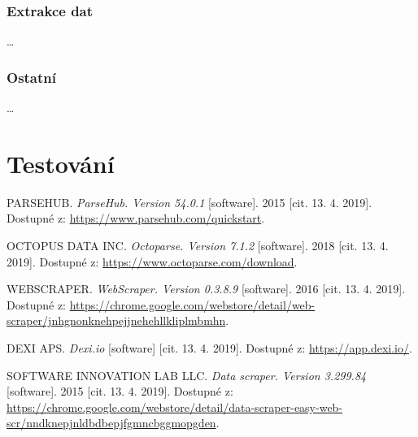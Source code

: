 \documentclass[thesis=B,czech]{FITthesis2}[2012/06/26]
\begin{document}
	\subsection{Extrakce dat}
	\dots
	
	\subsection{Ostatní}
	\dots
	
	
	\chapter{Testování}
	
	
	\begin{conclusion}
	\end{conclusion}
	
	
	
	\begin{thebibliography}{9}
		PARSEHUB. \textit{ParseHub. Version 54.0.1} [software]. 2015 [cit. 13. 4. 2019]. Dostupné z: \url{https://www.parsehub.com/quickstart}.
		
		OCTOPUS DATA INC. \textit{Octoparse. Version 7.1.2} [software]. 2018 [cit. 13. 4. 2019]. Dostupné z: \url{https://www.octoparse.com/download}.
		
		WEBSCRAPER. \textit{WebScraper. Version 0.3.8.9} [software]. 2016 [cit. 13. 4. 2019]. Dostupné z: \url{https://chrome.google.com/webstore/detail/web-scraper/jnhgnonknehpejjnehehllkliplmbmhn}.
		
		DEXI APS. \textit{Dexi.io} [software] [cit. 13. 4. 2019]. Dostupné z: \url{https://app.dexi.io/}.
		
		SOFTWARE INNOVATION LAB LLC. \textit{Data scraper. Version 3.299.84} [software]. 2015 [cit. 13. 4. 2019]. Dostupné z: \url{https://chrome.google.com/webstore/detail/data-scraper-easy-web-scr/nndknepjnldbdbepjfgmncbggmopgden}.
		
	\end{thebibliography}

	\appendix
	
\end{document}
